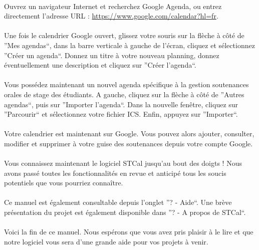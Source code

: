 \documentclass[a4paper,10pt]{book}
\begin{document}
	\paragraph{}
	  Ouvrez un navigateur Internet et recherchez Google Agenda, ou entrez directement l'adresse URL : \url{https://www.google.com/calendar?hl=fr}.
	  ~\\~\\
	  Une fois le calendrier Google ouvert, glissez votre souris sur la flèche à côté de ''Mes agendas``, dans la barre verticale à gauche de l'écran, cliquez et sélectionnez ''Créer un agenda``.
	  Donnez un titre à votre nouveau planning, donnez éventuellement une description et cliquez sur ''Créer l'agenda``.
	  ~\\~\\
	  Vous possédez maintenant un nouvel agenda spécifique à la gestion soutenances orales de stage des étudiants.
	  A gauche, cliquez sur la flèche à côté de ''Autres agendas``, puis sur ''Importer l'agenda``.
	  Dans la nouvelle fenêtre, cliquez sur ''Parcourir`` et sélectionnez votre fichier ICS.
	  Enfin, appuyez sur ''Importer``.
	  
	\paragraph{}
	  Votre calendrier est maintenant sur Google.
	  Vous pouvez alors ajouter, consulter, modifier et supprimer à votre guise des soutenances depuis votre compte Google.
	  
	\newpage
	\paragraph{}
	  Vous connaissez maintenant le logiciel STCal jusqu'au bout des doigts ! 
	  Nous avons passé toutes les fonctionnalités en revue et anticipé tous les soucis potentiels que vous pourriez connaître.
	  
	\paragraph{}
	  Ce manuel est également consultable depuis l'onglet ''? - Aide``.
	  Une brève présentation du projet est également disponible dans ''? - A propos de STCal``.
	

	\paragraph{}
	  Voici la fin de ce manuel.
	  Nous espérons que vous avez pris plaisir à le lire et que notre logiciel vous sera d'une grande aide pour vos projets à venir.
\end{document}
